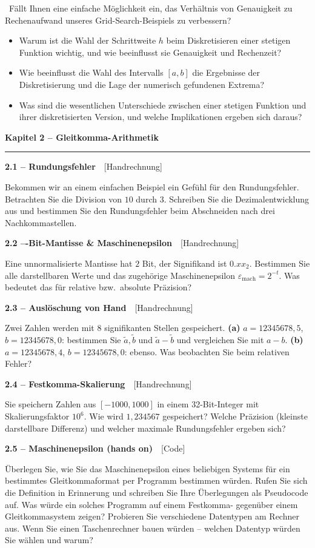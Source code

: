 \documentclass[a4paper,10pt]{article}
\newcommand{\kapitel}[1]{%
  \par\vspace{7pt}
  {\large\bfseries\color{accent} #1}\par
  \noindent\textcolor{accent}{\rule{\linewidth}{0.8pt}}\par\vspace{2pt}}
\newcommand{\aufg}[2]{%
  \par\vspace{3pt}
  {\bfseries\color{accent2} #1}~~{\footnotesize\color{accent2}[#2]}\par\vspace{1pt}}
\newcommand{\teaser}[1]{%
  \par\vspace{2pt}{\color{accent4}\textbf{Denkanstoß.}}~#1\par}
\newcommand{\reflexion}{%
  \par\vspace{2pt}{\bfseries\color{accent3} Selbstreflexionsfragen}\par\vspace{1pt}}
\begin{document}
\teaser{Fällt Ihnen eine einfache Möglichkeit ein, das Verhältnis von Genauigkeit
zu Rechenaufwand unseres Grid-Search-Beispiels zu verbessern?}

\reflexion
\begin{itemize}
  \item Warum ist die Wahl der Schrittweite $h$ beim Diskretisieren einer stetigen
        Funktion wichtig, und wie beeinflusst sie Genauigkeit und Rechenzeit?
  \item Wie beeinflusst die Wahl des Intervalls $[a,b]$ die Ergebnisse der
        Diskretisierung und die Lage der numerisch gefundenen Extrema?
  \item Was sind die wesentlichen Unterschiede zwischen einer stetigen Funktion und
        ihrer diskretisierten Version, und welche Implikationen ergeben sich daraus?
\end{itemize}

\kapitel{Kapitel 2 \;--\; Gleitkomma-Arithmetik}

\aufg{2.1 \;--\; Rundungsfehler}{Handrechnung}
Bekommen wir an einem einfachen Beispiel ein Gefühl für den Rundungsfehler.
Betrachten Sie die Division von $10$ durch $3$. Schreiben Sie die Dezimalentwicklung
aus und bestimmen Sie den Rundungsfehler beim Abschneiden nach drei
Nachkommastellen.

\aufg{2.2 \;---Bit-Mantisse \& Maschinenepsilon}{Handrechnung}
Eine unnormalisierte Mantisse hat $2$ Bit, der Signifikand ist $0{.}xx_2$. Bestimmen
Sie alle darstellbaren Werte und das zugehörige Maschinenepsilon
$\varepsilon_{\mathrm{mach}}=2^{-t}$. Was bedeutet das für relative bzw.\ absolute
Präzision?

\aufg{2.3 \;--\; Auslöschung von Hand}{Handrechnung}
Zwei Zahlen werden mit $8$ signifikanten Stellen gespeichert.
\textbf{(a)} $a=12345678{,}5$, $b=12345678{,}0$: bestimmen Sie $\tilde a,\tilde b$
und $\tilde a-\tilde b$ und vergleichen Sie mit $a-b$.
\textbf{(b)} $a=12345678{,}4$, $b=12345678{,}0$: ebenso. Was beobachten Sie beim
relativen Fehler?

\aufg{2.4 \;--\; Festkomma-Skalierung}{Handrechnung}
Sie speichern Zahlen aus $[-1000,1000]$ in einem 32-Bit-Integer mit Skalierungsfaktor
$10^{6}$. Wie wird $1{,}234567$ gespeichert? Welche Präzision (kleinste darstellbare
Differenz) und welcher maximale Rundungsfehler ergeben sich?

\aufg{2.5 \;--\; Maschinenepsilon (hands on)}{Code}
Überlegen Sie, wie Sie das Maschinenepsilon eines beliebigen Systems für ein
bestimmtes Gleitkommaformat per Programm bestimmen würden. Rufen Sie sich die
Definition in Erinnerung und schreiben Sie Ihre Überlegungen als Pseudocode auf. Was
würde ein solches Programm auf einem Festkomma- gegenüber einem Gleitkommasystem
zeigen? Probieren Sie verschiedene Datentypen am Rechner aus. Wenn Sie einen
Taschenrechner bauen würden -- welchen Datentyp würden Sie wählen und warum?
\end{document}
